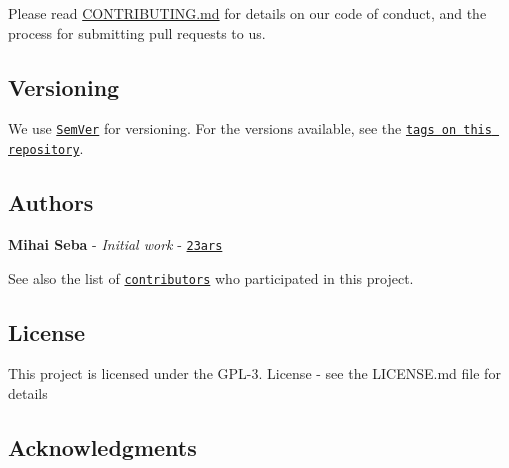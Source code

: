 Please read \hyperlink{_c_o_n_t_r_i_b_u_t_i_n_g_8md}{C\+O\+N\+T\+R\+I\+B\+U\+T\+I\+NG.md} for details on our code of conduct, and the process for submitting pull requests to us.

\subsection*{Versioning}

We use \href{http://semver.org/}{\tt Sem\+Ver} for versioning. For the versions available, see the \href{https://github.com/23ars/quantum_computing/tags}{\tt tags on this repository}.

\subsection*{Authors}


\begin{DoxyItemize}
\item {\bfseries Mihai Seba} -\/ {\itshape Initial work} -\/ \href{https://github.com/23ars}{\tt 23ars}
\end{DoxyItemize}

See also the list of \href{https://github.com/23ars/quantum_computing/contributors}{\tt contributors} who participated in this project.

\subsection*{License}

This project is licensed under the G\+P\+L-\/3. License -\/ see the L\+I\+C\+E\+N\+SE.md file for details

\subsection*{Acknowledgments}